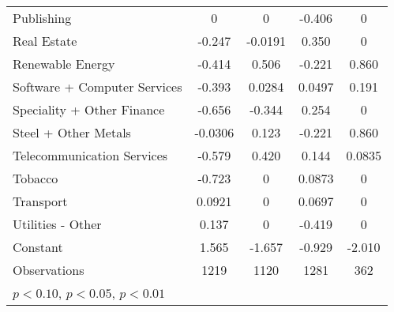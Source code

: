 {\begin{longtable}{l*{4}{c}}
Publishing      &        0         &        0         &   -0.406         &        0         \\
Real Estate     &   -0.247         &  -0.0191         &    0.350         &        0         \\
Renewable Energy&   -0.414         &    0.506         &   -0.221         &    0.860         \\
Software + Computer Services&   -0.393         &   0.0284         &   0.0497         &    0.191         \\
Speciality + Other Finance&   -0.656         &   -0.344         &    0.254         &        0         \\
Steel + Other Metals&  -0.0306         &    0.123         &   -0.221         &    0.860         \\
Telecommunication Services&   -0.579         &    0.420         &    0.144         &   0.0835         \\
Tobacco         &   -0.723         &        0         &   0.0873         &        0         \\
Transport       &   0.0921         &        0         &   0.0697         &        0         \\
Utilities - Other&    0.137         &        0         &   -0.419         &        0         \\
Constant        &    1.565\sym{***}&   -1.657\sym{***}&   -0.929\sym{***}&   -2.010\sym{***}\\
\midrule
Observations    &     1219         &     1120         &     1281         &      362         \\
\bottomrule
\multicolumn{5}{l}{\footnotesize \sym{*} \(p<0.10\), \sym{**} \(p<0.05\), \sym{***} \(p<0.01\)}\\
\end{longtable}
}

